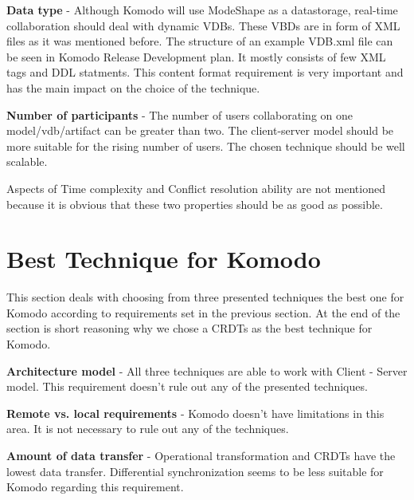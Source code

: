 \documentclass[12pt,oneside]{fithesis2}
\begin{document}
\textbf{Data type} - Although Komodo will use ModeShape as a datastorage, real-time collaboration should deal with dynamic VDBs. These VBDs are in form of XML files as it was mentioned before. The structure of an example VDB.xml file can be seen in Komodo Release Development plan\cite{Komodo}. It mostly consists of few XML tags and DDL statments. This content format requirement is very important and has the main impact on the choice of the technique.

\vspace{3mm} 

\textbf{Number of participants} - The number of users collaborating on one model/vdb/artifact can be greater than two. The client-server model should be more suitable for the rising number of users. The chosen technique should be well scalable.

\vspace{3mm} 

\par Aspects of Time complexity and Conflict resolution ability are not mentioned because it is obvious that these two properties should be as good as possible.
\section{Best Technique for Komodo} \label{best}
\par This section deals with choosing from three presented techniques the best one for Komodo according to requirements set in the previous section. At the end of the section is short reasoning why we chose a CRDTs as the best technique for Komodo. 

\vspace{3mm} 

\textbf{Architecture model} - All three techniques are able to work with Client - Server model. This requirement doesn't rule out any of the presented techniques.

\vspace{3mm} 

\textbf{Remote vs. local requirements} - Komodo doesn't have limitations in this area. It is not necessary to rule out any of the techniques.

\vspace{3mm} 

\textbf{Amount of data transfer} - Operational transformation and CRDTs have the lowest data transfer. Differential synchronization seems to be less suitable for Komodo regarding this requirement.	
\end{document}
